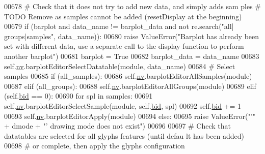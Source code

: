 \begin{DoxyCode}
00678                 \textcolor{comment}{# Check that it does not try to add new data, and simply adds sam
      ples # TODO Remove as samples cannot be added (resetDisplay at the beginning)}
00679                 \textcolor{keywordflow}{if} (barplot \textcolor{keywordflow}{and} data\_name != barplot\_data \textcolor{keywordflow}{and} \textcolor{keywordflow}{not} re.search(\textcolor{stringliteral}{"all|
      groups|samples"}, data\_name)):
00680                     \textcolor{keywordflow}{raise} ValueError(\textcolor{stringliteral}{"Barplot has already been set with different
       data, use a separate call to the display function to perform another barplot"})
00681                 barplot = \textcolor{keyword}{True}
00682                 barplot\_data = data\_name
00683                 self.\hyperlink{classnavicom_1_1navicom_1_1NaviCom_af740fe52f9f3cfc076ae88ca696bd05e}{nv}.barplotEditorSelectDatatable(module, data\_name)
00684                 \textcolor{comment}{# Select samples}
00685                 \textcolor{keywordflow}{if} (all\_samples):
00686                     self.\hyperlink{classnavicom_1_1navicom_1_1NaviCom_af740fe52f9f3cfc076ae88ca696bd05e}{nv}.barplotEditorAllSamples(module)
00687                 \textcolor{keywordflow}{elif} (all\_groups):
00688                     self.\hyperlink{classnavicom_1_1navicom_1_1NaviCom_af740fe52f9f3cfc076ae88ca696bd05e}{nv}.barplotEditorAllGroups(module)
00689                 \textcolor{keywordflow}{elif} (self.\hyperlink{classnavicom_1_1navicom_1_1NaviCom_a1f652094a5c16ca0b721856f5e5aadf2}{bid} == 0):
00690                     \textcolor{keywordflow}{for} spl \textcolor{keywordflow}{in} samples:
00691                         self.\hyperlink{classnavicom_1_1navicom_1_1NaviCom_af740fe52f9f3cfc076ae88ca696bd05e}{nv}.barplotEditorSelectSample(module, self.\hyperlink{classnavicom_1_1navicom_1_1NaviCom_a1f652094a5c16ca0b721856f5e5aadf2}{bid}, spl)
00692                         self.\hyperlink{classnavicom_1_1navicom_1_1NaviCom_a1f652094a5c16ca0b721856f5e5aadf2}{bid} += 1
00693                     self.\hyperlink{classnavicom_1_1navicom_1_1NaviCom_af740fe52f9f3cfc076ae88ca696bd05e}{nv}.barplotEditorApply(module)
00694             \textcolor{keywordflow}{else}:
00695                 \textcolor{keywordflow}{raise} ValueError(\textcolor{stringliteral}{"'"} + dmode + \textcolor{stringliteral}{"' drawing mode does not exist"})
00696 
00697         \textcolor{comment}{# Check that datatables are selected for all glyphs features (until defau
      lt has been added)}
00698         \textcolor{comment}{# or complete, then apply the glyphs configuration}

\end{DoxyCode}
